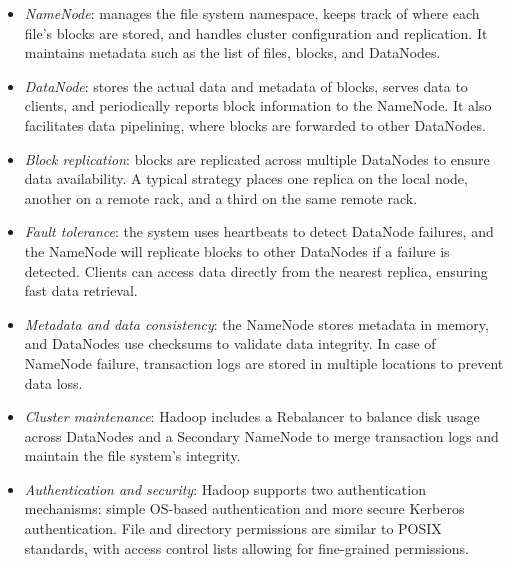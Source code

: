 \begin{itemize}
    \item \textit{NameNode}: manages the file system namespace, keeps track of where each file's blocks are stored, and handles cluster configuration and replication.
        It maintains metadata such as the list of files, blocks, and DataNodes.
    \item \textit{DataNode}: stores the actual data and metadata of blocks, serves data to clients, and periodically reports block information to the NameNode. 
        It also facilitates data pipelining, where blocks are forwarded to other DataNodes.
    \item \textit{Block replication}: blocks are replicated across multiple DataNodes to ensure data availability. 
        A typical strategy places one replica on the local node, another on a remote rack, and a third on the same remote rack.
    \item \textit{Fault tolerance}: the system uses heartbeats to detect DataNode failures, and the NameNode will replicate blocks to other DataNodes if a failure is detected. 
        Clients can access data directly from the nearest replica, ensuring fast data retrieval.
    \item \textit{Metadata and data consistency}: the NameNode stores metadata in memory, and DataNodes use checksums to validate data integrity. 
        In case of NameNode failure, transaction logs are stored in multiple locations to prevent data loss.
    \item \textit{Cluster maintenance}: Hadoop includes a Rebalancer to balance disk usage across DataNodes and a Secondary NameNode to merge transaction logs and maintain the file system's integrity.
    \item \textit{Authentication and security}: Hadoop supports two authentication mechanisms: simple OS-based authentication and more secure Kerberos authentication. 
        File and directory permissions are similar to POSIX standards, with access control lists allowing for fine-grained permissions.
\end{itemize}

